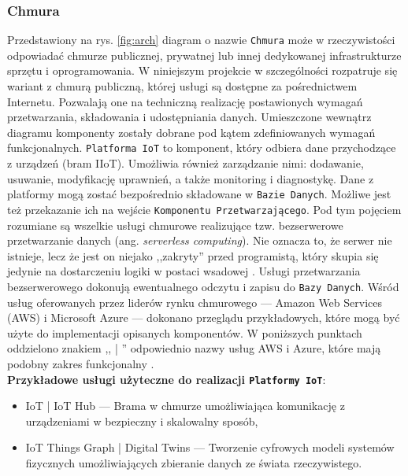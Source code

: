 \documentclass[a4paper, 12pt, twoside]{article}
\begin{document}
\subsubsection{Chmura}\label{cloud-general}
Przedstawiony na rys. \ref{fig:arch} diagram o nazwie \texttt{Chmura}
może w rzeczywistości odpowiadać chmurze publicznej, prywatnej lub innej
dedykowanej infrastrukturze sprzętu i oprogramowania. W niniejszym projekcie
w szczególności rozpatruje się wariant z chmurą publiczną, której usługi są dostępne
za pośrednictwem Internetu. Pozwalają one na techniczną realizację postawionych
wymagań przetwarzania, składowania i udostępniania danych.
Umieszczone wewnątrz diagramu komponenty zostały dobrane
pod kątem zdefiniowanych wymagań funkcjonalnych. \texttt{Platforma IoT}
to komponent, który odbiera dane przychodzące z urządzeń (bram IIoT).
Umożliwia również zarządzanie nimi:
dodawanie, usuwanie, modyfikację uprawnień, a także monitoring i diagnostykę.
Dane z platformy mogą zostać bezpośrednio składowane w \texttt{Bazie Danych}.
Możliwe jest też przekazanie ich na wejście \texttt{Komponentu Przetwarzającego}.
Pod tym pojęciem rozumiane są wszelkie usługi chmurowe realizujące tzw. bezserwerowe
przetwarzanie danych (ang. \emph{serverless computing}). Nie oznacza to, że
serwer nie istnieje, lecz że jest on niejako ,,zakryty'' przed programistą, który skupia
się jedynie na dostarczeniu logiki w postaci wsadowej \cite{azure-serverless}.
Usługi przetwarzania bezserwerowego dokonują ewentualnego odczytu i zapisu do \texttt{Bazy Danych}.
Wśród usług oferowanych przez liderów rynku chmurowego
--- Amazon Web Services (AWS) i Microsoft Azure \cite{gartner-cloud-liders}
--- dokonano przeglądu przykładowych, które mogą być użyte do implementacji opisanych komponentów.
W poniższych punktach oddzielono znakiem ,, | '' odpowiednio nazwy usług AWS i Azure,
które mają podobny zakres funkcjonalny \cite{azure-aws-comparison}.\\

\noindent\textbf{Przykładowe usługi użyteczne do realizacji \texttt{Platformy IoT}}:
\begin{itemize}
      \itemsep0em
      \item IoT | IoT Hub ---  Brama w chmurze umożliwiająca komunikację z
            urządzeniami w bezpieczny i skalowalny sposób,
      \item IoT Things Graph | Digital Twins --- Tworzenie cyfrowych modeli systemów
            fizycznych umożliwiających zbieranie danych ze świata rzeczywistego.
\end{itemize}
\end{document}
